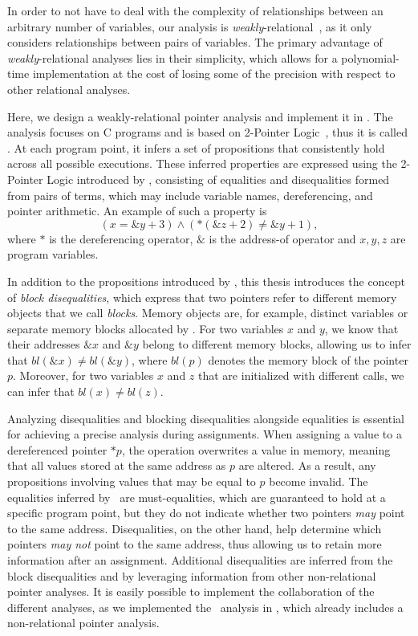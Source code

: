 In order to not have to deal with the complexity of relationships between an arbitrary number of variables, our analysis is \emph{weakly}-relational~\cite{octagon,SeidlETS2023}, as it only considers relationships between pairs of variables.
The primary advantage of \emph{weakly}-relational analyses lies in their simplicity, which allows for a polynomial-time implementation at the cost of losing some of the precision with respect to other relational analyses.

Here, we design a weakly-relational pointer analysis and implement it in \goblint.
The analysis focuses on C programs and is based on 2-Pointer Logic~\cite{2pointer}, thus it is called \cpo.
At each program point, it infers a set of propositions that consistently hold across all possible executions.
These inferred properties are expressed using the 2-Pointer Logic introduced by \textcite{2pointer},
consisting of equalities and disequalities formed from pairs of terms,
which may include variable names, dereferencing, and pointer arithmetic.
An example of such a property is
\begin{equation}\label{example:introduction}
    (x = \&y + 3) \land (*(\&z + 2) \neq \&y + 1),
\end{equation}
where $*$ is the dereferencing operator, $\&$ is the address-of operator and $x,y,z$ are program variables.

In addition to the propositions introduced by \textcite{2pointer}, this thesis introduces the concept of \emph{block disequalities},
which express that two pointers refer to different memory objects that we call \emph{blocks}.
Memory objects are, for example, distinct variables or separate memory blocks allocated by \malloc.
For two variables $x$ and $y$, we know that their addresses $\&x$ and $\&y$ belong to different memory blocks,
allowing us to infer that $bl(\&x) \neq bl(\&y)$, where $bl(p)$ denotes the memory block of the pointer $p$.
Moreover, for two variables $x$ and $z$ that are initialized with different \malloc calls,
we can infer that $bl(x) \neq bl(z)$.

Analyzing disequalities and blocking disequalities alongside equalities is essential for achieving a precise analysis during assignments.
When assigning a value to a dereferenced pointer $*p$,
the operation overwrites a value in memory, meaning that all values stored at the same address as
$p$ are altered.
As a result, any propositions involving values that may be equal to $p$ become invalid.
The equalities inferred by \cpo\ are must-equalities, which are guaranteed to hold at a specific program point, but they do not indicate whether two pointers \emph{may} point to the same address.
Disequalities, on the other hand, help determine which pointers \emph{may not} point to the same address,
thus allowing us to retain more information after an assignment.
Additional disequalities are inferred from the block disequalities and by
leveraging information from other non-relational pointer analyses.
It is easily possible to implement the collaboration of the different analyses, as we implemented the \cpo\ analysis in \goblint, which already includes a non-relational pointer analysis.

